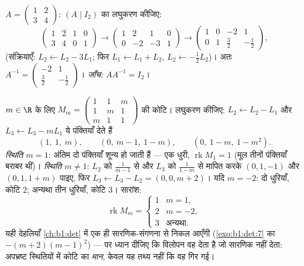\begin{example}\label{ex:b1:matrices:inverse}
$A = \begin{pmatrix} 1 & 2 \\ 3 & 4 \end{pmatrix}$: $(A \mid I_2)$ का लघुकरण
कीजिए:
\[
\begin{pmatrix} 1 & 2 & 1 & 0\\ 3 & 4 & 0 & 1 \end{pmatrix}
\to
\begin{pmatrix} 1 & 2 & 1 & 0\\ 0 & -2 & -3 & 1 \end{pmatrix}
\to
\begin{pmatrix} 1 & 0 & -2 & 1\\ 0 & 1 & \tfrac32 & -\tfrac12
\end{pmatrix},
\]
(संक्रियाएँ: $L_2 \leftarrow L_2 - 3L_1$; फिर $L_1 \leftarrow L_1 + L_2$,
$L_2 \leftarrow -\frac12 L_2$)। अतः $A^{-1} = \begin{pmatrix} -2 & 1 \\
\tfrac32 & -\tfrac12\end{pmatrix}$। \emph{जाँच:} $AA^{-1} = I_2$।
\end{example}

\begin{example}[प्राचल वाली कोटि, केवल पंक्तियों से]
\label{ex:b1:matrices:rankparameter}
$m \in \R$ के लिए $M_m = \begin{pmatrix} 1 & 1 & m\\ 1 & m & 1\\ m & 1 &
1\end{pmatrix}$ की कोटि। लघुकरण कीजिए: $L_2 \leftarrow L_2 - L_1$ और $L_3
\leftarrow L_3 - mL_1$ ये पंक्तियाँ देते हैं
\[
(1,\ 1,\ m), \qquad (0,\ m - 1,\ 1 - m), \qquad
(0,\ 1 - m,\ 1 - m^2).
\]
\emph{स्थिति $m = 1$}: अंतिम दो पंक्तियाँ शून्य हो जाती हैं --- एक धुरी,
$\operatorname{rk} M_1 = 1$ (मूल तीनों पंक्तियाँ बराबर थीं)। \emph{स्थिति $m
\neq 1$}: $L_2$ को $\frac1{m-1}$ से और $L_3$ को $\frac1{1-m}$ से मापित करके
$(0, 1, -1)$ और $(0, 1, 1 + m)$ पाइए, फिर $L_3 \leftarrow L_3 - L_2 = (0, 0,
m + 2)$। यदि $m = -2$: दो धुरियाँ, कोटि $2$; अन्यथा तीन धुरियाँ, कोटि $3$।
सारांश:
\[
\operatorname{rk} M_m =
\begin{cases}
1 & m = 1,\\
2 & m = -2,\\
3 & \text{अन्यथा}.
\end{cases}
\]
यही देहलियाँ \cref{ch:b1:det} में एक ही सारणिक-संगणना से निकल आएँगी
(\cref{exo:b1:det:7} का  $-(m+2)(m-1)^2$) --- पर ध्यान दीजिए कि विलोपन
वह देता है जो सारणिक नहीं देता: अपभ्रष्ट स्थितियों में कोटि का \emph{मान},
केवल यह तथ्य नहीं कि वह गिर गई।
\end{example}


